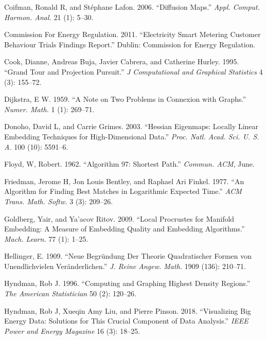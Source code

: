 \documentclass[12pt]{article}
\newlength{\cslhangindent}
\newenvironment{cslreferences}%
  {\setlength{\parindent}{0pt}%
  \everypar{\setlength{\hangindent}{\cslhangindent}}\ignorespaces}%
  {\par}
\begin{document}
\begin{cslreferences}
\leavevmode\hypertarget{ref-Coifman2006-no}{}%
Coifman, Ronald R, and Stéphane Lafon. 2006. ``Diffusion Maps.'' \emph{Appl. Comput. Harmon. Anal.} 21 (1): 5--30.

\leavevmode\hypertarget{ref-Commission_For_Energy_Regulation2011-ub}{}%
Commission For Energy Regulation. 2011. ``Electricity Smart Metering Customer Behaviour Trials Findings Report.'' Dublin: Commission for Energy Regulation.

\leavevmode\hypertarget{ref-Cook1995}{}%
Cook, Dianne, Andreas Buja, Javier Cabrera, and Catherine Hurley. 1995. ``Grand Tour and Projection Pursuit.'' \emph{J Computational and Graphical Statistics} 4 (3): 155--72.

\leavevmode\hypertarget{ref-Dijkstra1959-ml}{}%
Dijkstra, E W. 1959. ``A Note on Two Problems in Connexion with Graphs.'' \emph{Numer. Math.} 1 (1): 269--71.

\leavevmode\hypertarget{ref-Donoho2003-am}{}%
Donoho, David L, and Carrie Grimes. 2003. ``Hessian Eigenmaps: Locally Linear Embedding Techniques for High-Dimensional Data.'' \emph{Proc. Natl. Acad. Sci. U. S. A.} 100 (10): 5591--6.

\leavevmode\hypertarget{ref-FloydRobert1962-au}{}%
Floyd, W, Robert. 1962. ``Algorithm 97: Shortest Path.'' \emph{Commun. ACM}, June.

\leavevmode\hypertarget{ref-Friedman1977-dh}{}%
Friedman, Jerome H, Jon Louis Bentley, and Raphael Ari Finkel. 1977. ``An Algorithm for Finding Best Matches in Logarithmic Expected Time.'' \emph{ACM Trans. Math. Softw.} 3 (3): 209--26.

\leavevmode\hypertarget{ref-Goldberg2009-tb}{}%
Goldberg, Yair, and Ya'acov Ritov. 2009. ``Local Procrustes for Manifold Embedding: A Measure of Embedding Quality and Embedding Algorithms.'' \emph{Mach. Learn.} 77 (1): 1--25.

\leavevmode\hypertarget{ref-Hellinger_undated-rs}{}%
Hellinger, E. 1909. ``Neue Begründung Der Theorie Quadratischer Formen von Unendlichvielen Veränderlichen.'' \emph{J. Reine Angew. Math.} 1909 (136): 210--71.

\leavevmode\hypertarget{ref-HDR96}{}%
Hyndman, Rob J. 1996. ``Computing and Graphing Highest Density Regions.'' \emph{The American Statistician} 50 (2): 120--26.

\leavevmode\hypertarget{ref-Hyndman2018-nq}{}%
Hyndman, Rob J, Xueqin Amy Liu, and Pierre Pinson. 2018. ``Visualizing Big Energy Data: Solutions for This Crucial Component of Data Analysis.'' \emph{IEEE Power and Energy Magazine} 16 (3): 18--25.


\end{cslreferences}
\end{document}
